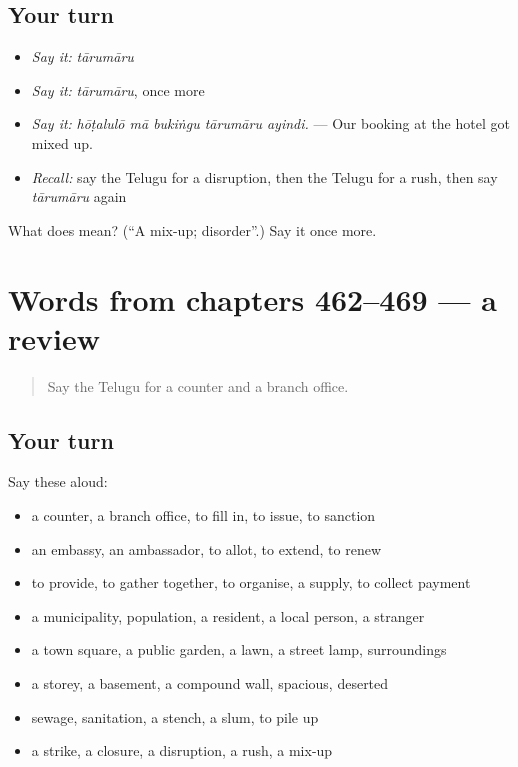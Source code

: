 \subsection*{Your turn}
\begin{itemize}
\raggedright
  \item \emph{Say it:} \emph{tārumāru}
  \item \emph{Say it:} \emph{tārumāru}, once more
  \item \emph{Say it:} \emph{hōṭalulō mā bukiṅgu tārumāru ayindi.} — Our booking at the hotel got mixed up.
  \item \emph{Recall:} say the Telugu for a disruption, then the Telugu for a rush, then say \emph{tārumāru} again
\end{itemize}

\begin{tcolorbox}[breakable,colback=teal!4,colframe=teal!35!black,title={Before you move on}]
What does  mean? (\textquotedblleft{}A mix-up; disorder\textquotedblright{}.) Say it once more.
\end{tcolorbox}
\section[(dialogue)]{Words from chapters 462–469 — a review}

\label{lesson:TE-R469-review-462-469}



\begin{quote}
Say the Telugu for a counter and a branch office.
\end{quote}

\subsection*{Your turn}
Say these aloud:

\begin{itemize}
\raggedright
  \item a counter, a branch office, to fill in, to issue, to sanction
  \item an embassy, an ambassador, to allot, to extend, to renew
  \item to provide, to gather together, to organise, a supply, to collect payment
  \item a municipality, population, a resident, a local person, a stranger
  \item a town square, a public garden, a lawn, a street lamp, surroundings
  \item a storey, a basement, a compound wall, spacious, deserted
  \item sewage, sanitation, a stench, a slum, to pile up
  \item a strike, a closure, a disruption, a rush, a mix-up
\end{itemize}

